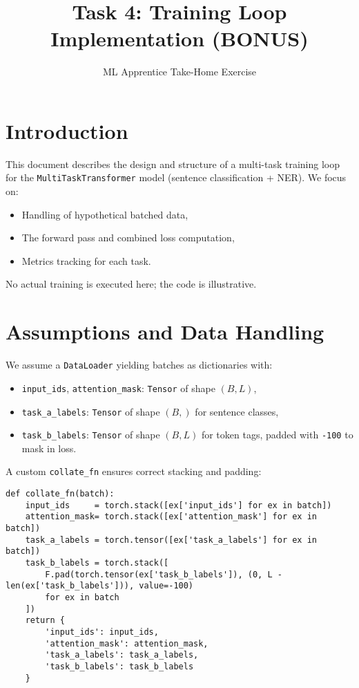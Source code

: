 \documentclass{article}
\title{Task 4: Training Loop Implementation (BONUS)}
\author{ML Apprentice Take-Home Exercise}
\date{}
\begin{document}
\maketitle

\section*{Introduction}
This document describes the design and structure of a multi-task training loop for the
\texttt{MultiTaskTransformer} model (sentence classification + NER). We focus on:
\begin{itemize}
  \item Handling of hypothetical batched data,
  \item The forward pass and combined loss computation,
  \item Metrics tracking for each task.
\end{itemize}
No actual training is executed here; the code is illustrative.

\section{Assumptions and Data Handling}
We assume a \texttt{DataLoader} yielding batches as dictionaries with:
\begin{itemize}
  \item \texttt{input\_ids}, \texttt{attention\_mask}: \texttt{Tensor} of shape $(B, L)$,
  \item \texttt{task\_a\_labels}: \texttt{Tensor} of shape $(B,)$ for sentence classes,
  \item \texttt{task\_b\_labels}: \texttt{Tensor} of shape $(B, L)$ for token tags,
        padded with \texttt{-100} to mask in loss.
\end{itemize}
A custom \texttt{collate\_fn} ensures correct stacking and padding:
\begin{lstlisting}
def collate_fn(batch):
    input_ids     = torch.stack([ex['input_ids'] for ex in batch])
    attention_mask= torch.stack([ex['attention_mask'] for ex in batch])
    task_a_labels = torch.tensor([ex['task_a_labels'] for ex in batch])
    task_b_labels = torch.stack([
        F.pad(torch.tensor(ex['task_b_labels']), (0, L - len(ex['task_b_labels'])), value=-100)
        for ex in batch
    ])
    return {
        'input_ids': input_ids,
        'attention_mask': attention_mask,
        'task_a_labels': task_a_labels,
        'task_b_labels': task_b_labels
    }
\end{lstlisting}
\end{document}

